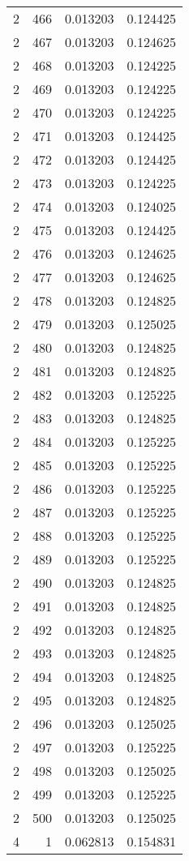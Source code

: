 \begin{longtable}{rrrr}
2 & 466 & 0.013203 & 0.124425 \\
2 & 467 & 0.013203 & 0.124625 \\
2 & 468 & 0.013203 & 0.124225 \\
2 & 469 & 0.013203 & 0.124225 \\
2 & 470 & 0.013203 & 0.124225 \\
2 & 471 & 0.013203 & 0.124425 \\
2 & 472 & 0.013203 & 0.124425 \\
2 & 473 & 0.013203 & 0.124225 \\
2 & 474 & 0.013203 & 0.124025 \\
2 & 475 & 0.013203 & 0.124425 \\
2 & 476 & 0.013203 & 0.124625 \\
2 & 477 & 0.013203 & 0.124625 \\
2 & 478 & 0.013203 & 0.124825 \\
2 & 479 & 0.013203 & 0.125025 \\
2 & 480 & 0.013203 & 0.124825 \\
2 & 481 & 0.013203 & 0.124825 \\
2 & 482 & 0.013203 & 0.125225 \\
2 & 483 & 0.013203 & 0.124825 \\
2 & 484 & 0.013203 & 0.125225 \\
2 & 485 & 0.013203 & 0.125225 \\
2 & 486 & 0.013203 & 0.125225 \\
2 & 487 & 0.013203 & 0.125225 \\
2 & 488 & 0.013203 & 0.125225 \\
2 & 489 & 0.013203 & 0.125225 \\
2 & 490 & 0.013203 & 0.124825 \\
2 & 491 & 0.013203 & 0.124825 \\
2 & 492 & 0.013203 & 0.124825 \\
2 & 493 & 0.013203 & 0.124825 \\
2 & 494 & 0.013203 & 0.124825 \\
2 & 495 & 0.013203 & 0.124825 \\
2 & 496 & 0.013203 & 0.125025 \\
2 & 497 & 0.013203 & 0.125225 \\
2 & 498 & 0.013203 & 0.125025 \\
2 & 499 & 0.013203 & 0.125225 \\
2 & 500 & 0.013203 & 0.125025 \\
4 & 1 & 0.062813 & 0.154831 \\

\end{longtable}
